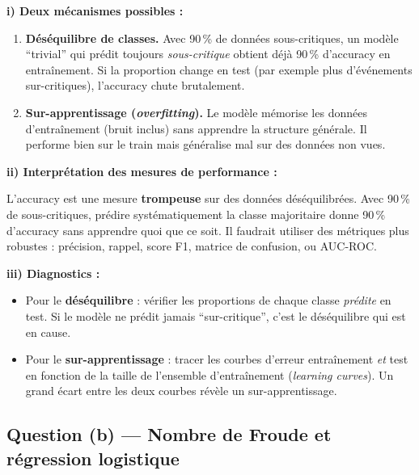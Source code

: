 \documentclass[12pt,a4paper]{article}
\begin{document}
\begin{solution}

\textbf{i) Deux mécanismes possibles :}

\begin{enumerate}[label=\textcircled{\small\arabic*},itemsep=4pt]
  \item \textbf{Déséquilibre de classes.}
  Avec 90\,\% de données sous-critiques, un modèle ``trivial'' qui prédit toujours
  \emph{sous-critique} obtient déjà 90\,\% d'accuracy en entraînement.
  Si la proportion change en test (par exemple plus d'événements sur-critiques),
  l'accuracy chute brutalement.

  \item \textbf{Sur-apprentissage (\emph{overfitting}).}
  Le modèle mémorise les données d'entraînement (bruit inclus) sans apprendre
  la structure générale. Il performe bien sur le train mais généralise mal sur
  des données non vues.
\end{enumerate}

\medskip
\textbf{ii) Interprétation des mesures de performance :}

L'accuracy est une mesure \textbf{trompeuse} sur des données déséquilibrées.
Avec 90\,\% de sous-critiques, prédire systématiquement la classe majoritaire
donne 90\,\% d'accuracy sans apprendre quoi que ce soit.
Il faudrait utiliser des métriques plus robustes : précision, rappel, score F1,
matrice de confusion, ou AUC-ROC.

\medskip
\textbf{iii) Diagnostics :}

\begin{itemize}[itemsep=4pt]
  \item Pour le \textbf{déséquilibre} : vérifier les proportions de chaque classe
  \emph{prédite} en test. Si le modèle ne prédit jamais ``sur-critique'', c'est
  le déséquilibre qui est en cause.

  \item Pour le \textbf{sur-apprentissage} : tracer les courbes d'erreur
  entraînement \emph{et} test en fonction de la taille de l'ensemble
  d'entraînement (\emph{learning curves}).
  Un grand écart entre les deux courbes révèle un sur-apprentissage.
\end{itemize}
\end{solution}

\subsection{Question (b) — Nombre de Froude et régression logistique}
\end{document}
